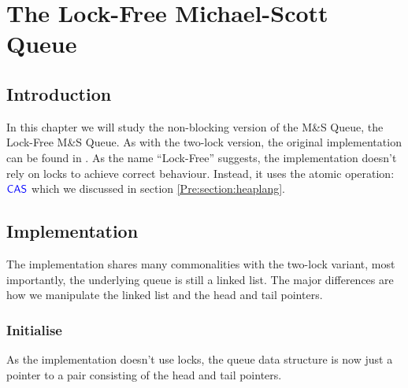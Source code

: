 \documentclass[a4paper, 10pt]{report}
\theoremstyle{definition}
\newcommand{\msq}{M\&S Queue}
\newcommand{\lfmsq}{Lock-Free \msq{}}
\begin{document}
\chapter{The Lock-Free Michael-Scott Queue}
\label{ch:LFMSQ}

\section{Introduction}
\label{LFMSQ:section:introduction}

In this chapter we will study the non-blocking version of the \msq{}, the \lfmsq{}. As with the two-lock version, the original implementation can be found in \citet{DBLP:conf/podc/MichaelS96}. As the name ``Lock-Free'' suggests, the implementation doesn't rely on locks to achieve correct behaviour. Instead, it uses the atomic operation: $\textsf{\color{blue} CAS}$ which we discussed in section \ref{Pre:section:heaplang}.

\section{Implementation}
\label{LFMSQ:section:implementation}

The implementation shares many commonalities with the two-lock variant, most importantly, the underlying queue is still a linked list. The major differences are how we manipulate the linked list and the head and tail pointers.

\subsection{Initialise}
As the implementation doesn't use locks, the queue data structure is now just a pointer to a pair consisting of the head and tail pointers.
\end{document}
